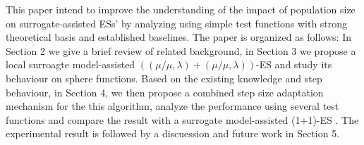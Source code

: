 
This paper intend to improve the understanding of the impact of population size on surrogate-assisted ESs' by analyzing using simple test functions with strong theoretical basis and established baselines. The paper is organized as follows: In Section 2 we give a brief review of related background, in Section 3 we propose a local surroagte model-assisted $((\mu/\mu,\lambda)+(\mu/\mu,\lambda))$-ES and study its behaviour on sphere functions. Based on the existing knowledge and step behaviour, in Section 4, we then propose a combined step size adaptation mechanism for the this algorithm, analyze the performance using several test functions and compare the result with a surrogate model-assisted (1+1)-ES \cite{DBLP:conf/ppsn/KayhaniA18}. The experimental result is followed by a discuession and future work in Section 5. 





